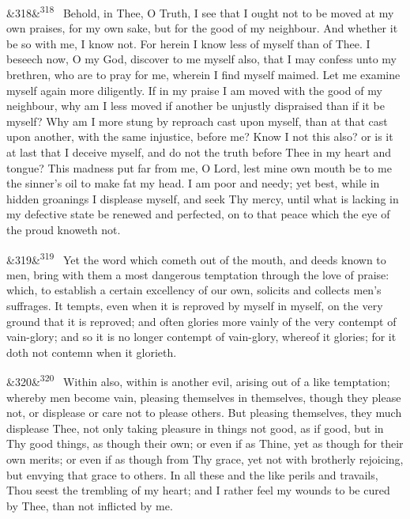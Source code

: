 \documentclass[12pt]{article}
\newcommand{\para}[1][]{\par\noindent\ifx&#1&\else\textsuperscript{\footnotesize #1}~\fi}
\begin{document}
\para[318] Behold, in Thee, O Truth, I see that I ought not to be moved at my own praises, for my own sake, but for the good of my neighbour. And whether it be so with me, I know not. For herein I know less of myself than of Thee. I beseech now, O my God, discover to me myself also, that I may confess unto my brethren, who are to pray for me, wherein I find myself maimed. Let me examine myself again more diligently. If in my praise I am moved with the good of my neighbour, why am I less moved if another be unjustly dispraised than if it be myself? Why am I more stung by reproach cast upon myself, than at that cast upon another, with the same injustice, before me? Know I not this also? or is it at last that I deceive myself, and do not the truth before Thee in my heart and tongue? This madness put far from me, O Lord, lest mine own mouth be to me the sinner's oil to make fat my head. I am poor and needy; yet best, while in hidden groanings I displease myself, and seek Thy mercy, until what is lacking in my defective state be renewed and perfected, on to that peace which the eye of the proud knoweth not.

\para[319] Yet the word which cometh out of the mouth, and deeds known to men, bring with them a most dangerous temptation through the love of praise: which, to establish a certain excellency of our own, solicits and collects men's suffrages. It tempts, even when it is reproved by myself in myself, on the very ground that it is reproved; and often glories more vainly of the very contempt of vain-glory; and so it is no longer contempt of vain-glory, whereof it glories; for it doth not contemn when it glorieth.

\para[320] Within also, within is another evil, arising out of a like temptation; whereby men become vain, pleasing themselves in themselves, though they please not, or displease or care not to please others. But pleasing themselves, they much displease Thee, not only taking pleasure in things not good, as if good, but in Thy good things, as though their own; or even if as Thine, yet as though for their own merits; or even if as though from Thy grace, yet not with brotherly rejoicing, but envying that grace to others. In all these and the like perils and travails, Thou seest the trembling of my heart; and I rather feel my wounds to be cured by Thee, than not inflicted by me.
\end{document}
